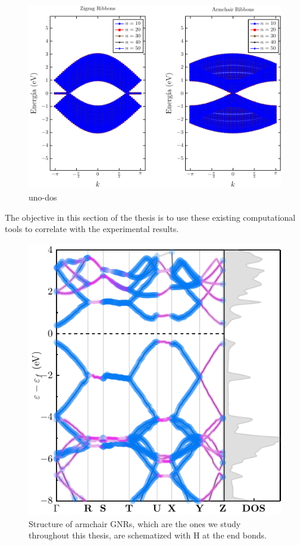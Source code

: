 \begin{figure}[H]
	\centering
	\includegraphics[width=0.82\linewidth]{FIGURES/Physical_Background/Teoria_Fig5b.pdf}
	\caption{uno-dos}
	\label{fig:sq-how to reflex}
\end{figure}

\vspace{-1cm}
The objective in this section of the thesis is to use these existing computational tools to correlate with the experimental results.

\begin{figure}[h!]
	\centering
	\includegraphics[width=0.80\linewidth]{FIGURES/Physical_Background/PLOT-GNRS007}
	\caption{Structure of armchair GNRs, which are the ones we study throughout this thesis, are schematized with H at the end bonds. }
	\label{fig:introfig32}
\end{figure}


